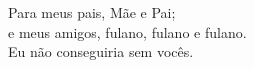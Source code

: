 \thispagestyle{pretext}

\vspace*{\fill}

\begin{flushright}
    Para meus pais, Mãe e Pai; \\
    e meus amigos, fulano, fulano e fulano. \\
    Eu não conseguiria sem vocês. \\
\end{flushright}

\newpage